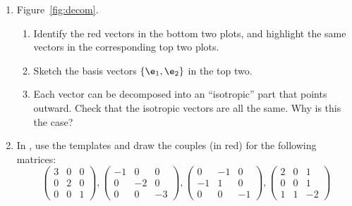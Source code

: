 \documentclass[11pt,titlepage,fleqn]{article}
\begin{document}
\begin{enumerate}

\item 
\label{prob:decom}
Figure~\ref{fig:decom}.
%
\begin{enumerate}
\item Identify the red vectors in the bottom two plots, and highlight the same vectors in the corresponding top two plots.
\item Sketch the basis vectors $\{\e_1,\e_2\}$ in the top two.
\item Each vector can be decomposed into an ``isotropic'' part that points outward. Check that the isotropic vectors are all the same. Why is this the case?
\end{enumerate}


\item 
\label{prob:arrows}
In , use the templates and draw the couples (in red) for the following matrices:
%
\begin{equation*}
\begin{pmatrix} 3 &  0 & 0 \\  0 & 2 & 0 \\ 0 & 0 &  1 \end{pmatrix},
\begin{pmatrix} -1 &  0 & 0 \\  0 & -2 & 0 \\ 0 & 0 & -3 \end{pmatrix},
\begin{pmatrix} 0 & -1 & 0 \\ -1 & 1 & 0 \\ 0 & 0 & -1 \end{pmatrix},
\begin{pmatrix} 2 &  0 & 1 \\  0 & 0 & 1 \\ 1 & 1 & -2 \end{pmatrix}
\end{equation*}


\end{enumerate}



\end{document}
